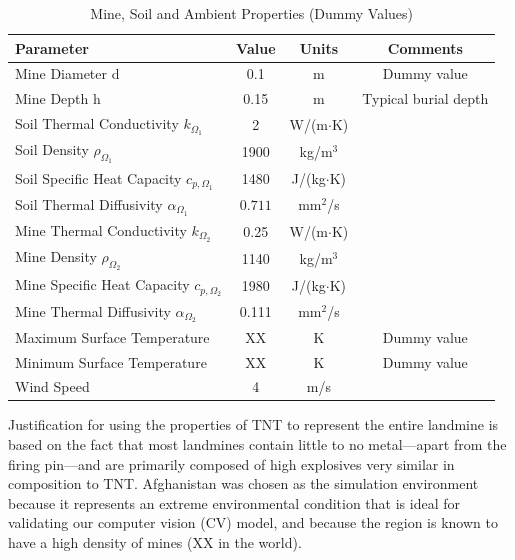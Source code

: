         \begin{table}[ht]
        \centering
        \caption{Mine, Soil and Ambient Properties (Dummy Values)}
        \label{tab:properties}
        \begin{tabular}{lccc}
        \hline
        \textbf{Parameter} & \textbf{Value} & \textbf{Units} & \textbf{Comments}\\
        \hline
        Mine Diameter d       & 0.1     & m    & Dummy value\\
        Mine Depth h          & 0.15   & m    & Typical burial depth\\
        Soil Thermal Conductivity $k_{\Omega_1}$ & 2  & W/(m$\cdot$K) & \cite{dummyRef1}\\
        Soil Density $\rho_{\Omega_1}$     & 1900     & kg/m$^3$ & \cite{dummyRef1}\\
        Soil Specific Heat Capacity $c_{p,{\Omega_1}}$  & 1480     & J/(kg$\cdot$K) & \cite{dummyRef1}\\
        Soil Thermal Diffusivity $\alpha_{\Omega_1}$ & $0.711$ & mm$^2$/s    & \cite{dummyRef2}\\
        Mine Thermal Conductivity $k_{\Omega_2}$ & 0.25  & W/(m$\cdot$K) & \cite{dummyRef1}\\
        Mine Density $\rho_{\Omega_2}$      & 1140     & kg/m$^3$ & \cite{dummyRef1}\\
        Mine Specific Heat Capacity $c_{p,{\Omega_2}}$ & 1980     & J/(kg$\cdot$K) & \cite{dummyRef1}\\
        Mine Thermal Diffusivity $\alpha_{\Omega_2}$ & 0.111 & mm$^2$/s    & \cite{dummyRef2}\\
        Maximum Surface Temperature & XX & K    & Dummy value\\
        Minimum Surface Temperature & XX & K    & Dummy value\\
        Wind Speed          & 4      & m/s  & \cite{dummyRef2}\\
        \hline
        \end{tabular}
        \end{table}
    
        Justification for using the properties of TNT to represent the entire landmine is based on the fact that most landmines contain little to no metal—apart from the firing pin—and are primarily composed of high explosives very similar in composition to TNT. Afghanistan was chosen as the simulation environment because it represents an extreme environmental condition that is ideal for validating our computer vision (CV) model, and because the region is known to have a high density of mines (XX in the world).

